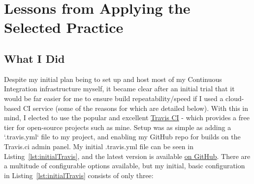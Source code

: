 \section{Lessons from Applying the Selected Practice}
\label{sec:Lessons from Applying the Selected Practice}

\subsection{What I Did}
\label{sub:What I Did}


Despite my initial plan being to set up and host most of my Continuous
Integration infrastructure myself, it became clear after an initial trial
that it would be far easier for me to ensure build repeatability/speed if I used
a cloud-based CI service (some of the reasons for which are detailed below).
With this in mind, I elected to use the popular and
excellent \href{https://travis-ci.org/}{Travis CI} - which provides a free tier
for open-source projects such as mine. Setup was as simple as adding a
`.travis.yml` file to my project, and enabling my GitHub repo for builds on
the Travis.ci admin panel. My initial .travis.yml file can be seen in
Listing~\ref{lst:initialTravis}, and the latest version is available
\href{https://github.com/FireEater64/gamq/blob/master/.travis.yml}{on GitHub}.
There are a multitude of configurable options available, but
my initial, basic configuration in Listing~\ref{lst:initialTravis} consists of
only three:

